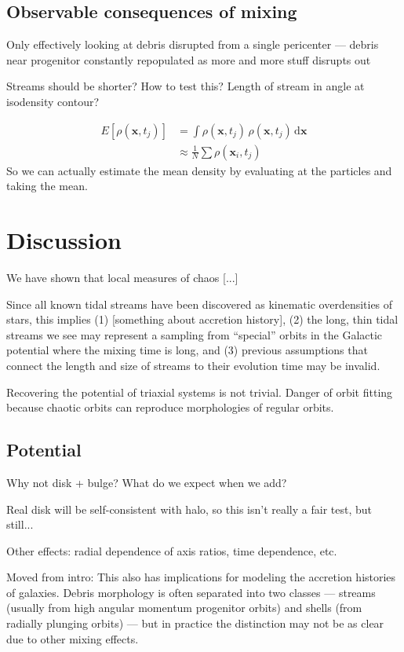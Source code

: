 \documentclass[letterpaper,12pt,preprint]{aastex}
\newcommand{\dd}{\mathrm{d}}
\newcommand{\bs}[1]{\boldsymbol{#1}}
\begin{document}
\subsection{Observable consequences of mixing}

Only effectively looking at debris disrupted from a single pericenter --- debris near progenitor constantly repopulated as more and more stuff disrupts out

Streams should be shorter? How to test this? Length of stream in angle at isodensity contour?

\begin{align}
	E[\rho(\bs{x},t_j)] &= \int \rho(\bs{x},t_j) \, \rho(\bs{x},t_j) \, \dd \bs{x}\\
	&\approx \frac{1}{N}\sum \rho(\bs{x}_i,t_j)
\end{align}
So we can actually estimate the mean density by evaluating at the particles and taking the mean.

\section{Discussion}\label{sec:discussion}

We have shown that local measures of chaos [...]

Since all known tidal streams have been discovered as kinematic overdensities of stars, this implies (1) [something about accretion history], (2) the long, thin tidal streams we see may represent a sampling from ``special'' orbits in the Galactic potential where the mixing time is long, and (3) previous assumptions that connect the length and size of streams to their evolution time may be invalid.

Recovering the potential of triaxial systems is not trivial. Danger of orbit fitting because chaotic orbits can reproduce morphologies of regular orbits.

\subsection{Potential}

Why not disk + bulge? What do we expect when we add?

Real disk will be self-consistent with halo, so this isn't really a fair test, but still...

Other effects: radial dependence of axis ratios, time dependence, etc.

Moved from intro:
This also has implications for modeling the accretion histories of galaxies. Debris morphology is often separated into two classes --- streams (usually from high angular momentum progenitor orbits) and shells (from radially plunging orbits) --- but in practice the distinction may not be as clear due to other mixing effects.
\end{document}
